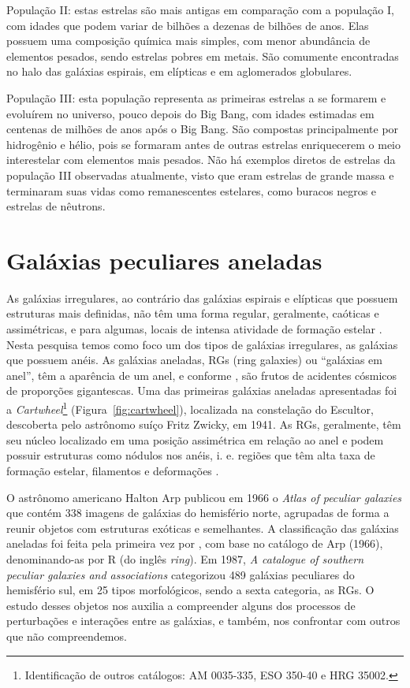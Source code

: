 População II: estas estrelas são mais antigas em comparação com a população I, com idades que podem variar de bilhões a dezenas de bilhões de anos. Elas possuem uma composição química mais simples, com menor abundância de elementos pesados, sendo estrelas pobres em metais. São comumente encontradas no halo das galáxias espirais, em elípticas e em aglomerados globulares.

População III: esta população representa as primeiras estrelas a se formarem e evoluírem no universo, pouco depois do Big Bang, com idades estimadas em centenas de milhões de anos após o Big Bang. São compostas principalmente por hidrogênio e hélio, pois se formaram antes de outras estrelas enriquecerem o meio interestelar com elementos mais pesados. Não há exemplos diretos de estrelas da população III observadas atualmente, visto que eram estrelas de grande massa e terminaram suas vidas como remanescentes estelares, como buracos negros e estrelas de nêutrons.

\section{Galáxias peculiares aneladas}

As galáxias irregulares, ao contrário das galáxias espirais e elípticas que possuem estruturas mais definidas, não têm uma forma regular, geralmente, caóticas e assimétricas, e para algumas, locais de intensa atividade de formação estelar \cite{2023Muller}. Nesta pesquisa temos como foco um dos tipos de galáxias irregulares, as galáxias que possuem anéis. As galáxias aneladas, RGs (ring galaxies) ou ``galáxias em anel'', têm a aparência de um anel, e conforme , são frutos de acidentes cósmicos de proporções gigantescas. Uma das primeiras galáxias aneladas apresentadas foi a \emph{Cartwheel}\footnote{Identificação de outros catálogos: AM 0035-335, ESO 350-40 e HRG 35002.} (Figura~\ref{fig:cartwheel}), localizada na constelação do Escultor, descoberta pelo astrônomo suíço Fritz Zwicky, em 1941. As RGs, geralmente, têm seu núcleo localizado em uma posição assimétrica em relação ao anel e podem possuir estruturas como nódulos nos anéis, i. e. regiões que têm alta taxa de formação estelar, filamentos e deformações \cite{2016lago}. 

O astrônomo americano Halton Arp publicou em 1966 o \emph{Atlas of peculiar galaxies} \cite{1966Arp} que contém 338 imagens de galáxias do hemisfério norte, agrupadas de forma a reunir objetos com estruturas exóticas e semelhantes. A classificação das galáxias aneladas foi feita pela primeira vez por , com base no catálogo de Arp (1966), denominando-as por R (do inglês \emph{ring}). Em 1987, \emph{A catalogue of southern peculiar galaxies and associations} \cite{1987arpmadore} categorizou 489 galáxias peculiares do hemisfério sul, em 25 tipos morfológicos, sendo a sexta categoria, as RGs. O estudo desses objetos nos auxilia a compreender alguns dos processos de perturbações e interações entre as galáxias, e também, nos confrontar com outros que não compreendemos.

